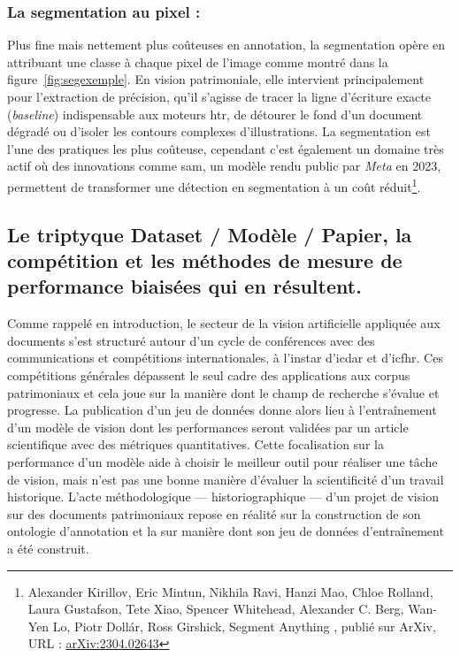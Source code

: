 \subsubsection{La segmentation au pixel :} Plus fine mais nettement plus coûteuses en annotation, la segmentation opère en attribuant une classe à chaque pixel de l'image comme montré dans la figure~\ref{fig:segexemple}. En vision patrimoniale, elle intervient principalement pour l'extraction de précision, qu'il s'agisse de tracer la ligne d'écriture exacte (\textit{baseline}) indispensable aux moteurs \gls{htr}, de détourer le fond d'un document dégradé ou d'isoler les contours complexes d'illustrations. La segmentation est l'une des pratiques les plus coûteuse, cependant c'est également un domaine très actif où des innovations comme \gls{sam}, un modèle rendu public par \textit{Meta} en 2023, permettent de transformer une détection en segmentation à un coût réduit\footnote{Alexander Kirillov, Eric Mintun, Nikhila Ravi, Hanzi Mao, Chloe Rolland, Laura Gustafson, Tete Xiao, Spencer Whitehead, Alexander C. Berg, Wan-Yen Lo, Piotr Dollár, Ross Girshick, \og Segment Anything \fg, publié sur ArXiv, URL : \href{https://arxiv.org/abs/2304.02643}{arXiv:2304.02643}}.

\subsection[Le triptyque Dataset / Modèle / Papier]{Le triptyque Dataset / Modèle / Papier, la compétition et les méthodes de mesure de performance biaisées qui en résultent.} 

Comme rappelé en introduction, le secteur de la vision artificielle appliquée aux documents s'est structuré autour d'un cycle de conférences avec des communications et compétitions internationales, à l'instar d'\gls{icdar} et d'\gls{icfhr}. Ces compétitions générales dépassent le seul cadre des applications aux corpus patrimoniaux et cela joue sur la manière dont le champ de recherche s'évalue et progresse. La publication d'un jeu de données donne alors lieu à l'entraînement d'un modèle de vision dont les performances seront validées par un article scientifique avec des métriques quantitatives. Cette focalisation sur la performance d'un modèle aide à choisir le meilleur outil pour réaliser une tâche de vision, mais n'est pas une bonne manière d'évaluer la scientificité d'un travail historique. L'acte méthodologique --- historiographique --- d'un projet de vision sur des documents patrimoniaux repose en réalité sur la construction de son ontologie d'annotation et la sur manière dont son jeu de données d'entraînement a été construit. 

